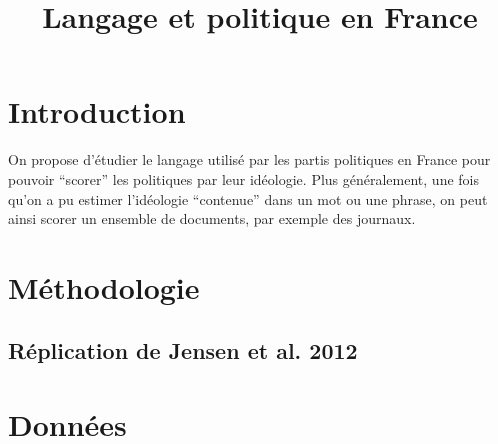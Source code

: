 \documentclass[12pt]{article}%
\begin{document}
\title{{Langage et politique en France}}%
 
\maketitle

\begin{abstract}



\thispagestyle{empty}
\end{abstract}


\newpage


\section{Introduction}

On propose d'étudier le langage utilisé par les partis politiques en France pour pouvoir ``scorer'' les politiques par leur idéologie. Plus généralement, une fois qu'on a pu estimer l'idéologie ``contenue'' dans un mot ou une phrase, on peut ainsi scorer un ensemble de documents, par exemple des journaux.

\section{Méthodologie}

\subsection{Réplication de Jensen et al. 2012}

\begin{itemize}

\end{itemize}


\section{Données}
\end{document}
